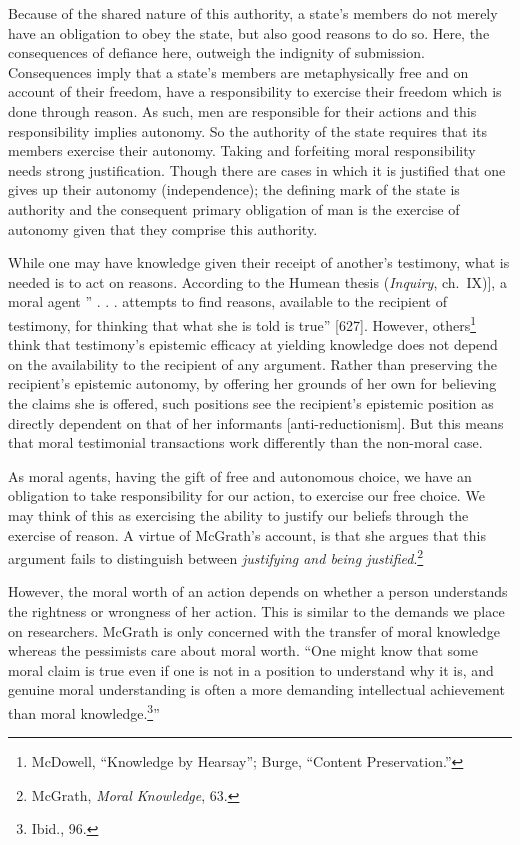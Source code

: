 \documentclass[phdthesis,12pt,final]{wuthesis}
\theoremstyle{definition}
\theoremstyle{definition}
\theoremstyle{definition}
\theoremstyle{definition}
\theoremstyle{remark}
\begin{document}
Because of the shared nature of this authority, a state's members do not merely have an obligation to obey the state, but also good reasons to do so. Here, the consequences of defiance here, outweigh the indignity of submission. Consequences imply that a state's members are metaphysically free and on account of their freedom, have a responsibility to exercise their freedom which is done through reason. As such, men are responsible for their actions and this responsibility implies autonomy. So the authority of the state requires that its members exercise their autonomy. Taking and forfeiting moral responsibility needs strong justification. Though there are cases in which it is justified that one gives up their autonomy (independence); the defining mark of the state is authority and the consequent primary obligation of man is the exercise of autonomy given that they comprise this authority.

While one may have knowledge given their receipt of another's testimony, what is needed is to act on reasons. According to the Humean thesis (\emph{Inquiry}, ch.~IX){]}, a moral agent '' . . . attempts to find reasons, available to the recipient of testimony, for thinking that what she is told is true'' {[}627{]}. However, others\footnote{McDowell, {``Knowledge by {Hearsay}''}; Burge, {``Content {Preservation}.''}} think that testimony's epistemic efficacy at yielding knowledge does not depend on the availability to the recipient of any argument. Rather than preserving the recipient's epistemic autonomy, by offering her grounds of her own for believing the claims she is offered, such positions see the recipient's epistemic position as directly dependent on that of her informants {[}anti-reductionism{]}. But this means that moral testimonial transactions work differently than the non-moral case.

As moral agents, having the gift of free and autonomous choice, we have an obligation to take responsibility for our action, to exercise our free choice. We may think of this as exercising the ability to justify our beliefs through the exercise of reason. A virtue of McGrath's account, is that she argues that this argument fails to distinguish between \emph{justifying and being justified}.\footnote{McGrath, \emph{Moral {Knowledge}}, 63.}

However, the moral worth of an action depends on whether a person understands the rightness or wrongness of her action. This is similar to the demands we place on researchers. McGrath is only concerned with the transfer of moral knowledge whereas the pessimists care about moral worth. ``One might know that some moral claim is true even if one is not in a position to understand why it is, and genuine moral understanding is often a more demanding intellectual achievement than moral knowledge.\footnote{Ibid., 96.}''
\end{document}
